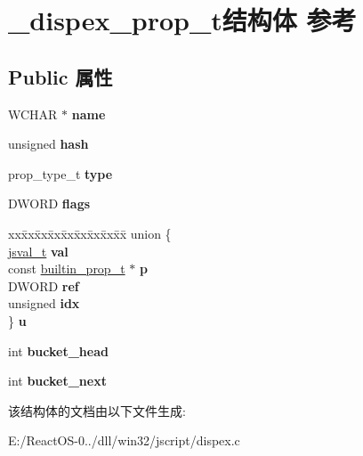 \hypertarget{struct__dispex__prop__t}{}\section{\+\_\+dispex\+\_\+prop\+\_\+t结构体 参考}
\label{struct__dispex__prop__t}
\subsection*{Public 属性}
\begin{DoxyCompactItemize}
\item 
\mbox{\label{struct__dispex__prop__t_a33a0ad0d74b1007f90173ca262cc3cc3}} 
W\+C\+H\+AR $\ast$ {\bfseries name}
\item 
\mbox{\label{struct__dispex__prop__t_a3b27a922c8fab3c080a8ba4c6651bee4}} 
unsigned {\bfseries hash}
\item 
\mbox{\label{struct__dispex__prop__t_a37ef3e687d76046dd4cf5be53839c8d2}} 
prop\+\_\+type\+\_\+t {\bfseries type}
\item 
\mbox{\label{struct__dispex__prop__t_a9407ca5f6f3c60ecca70d27e4b6dcdaf}} 
D\+W\+O\+RD {\bfseries flags}
\item 
\mbox{\label{struct__dispex__prop__t_ad9700abefb9a459d7f251ba5d3f75269}} 
\begin{tabbing}
xx\=xx\=xx\=xx\=xx\=xx\=xx\=xx\=xx\=\kill
union \{\\
\>\hyperlink{struct__jsval__t}{jsval\_t} {\bfseries val}\\
\>const \hyperlink{structbuiltin__prop__t}{builtin\_prop\_t} $\ast$ {\bfseries p}\\
\>DWORD {\bfseries ref}\\
\>unsigned {\bfseries idx}\\
\} {\bfseries u}\\

\end{tabbing}\item 
\mbox{\label{struct__dispex__prop__t_a790a3b004c478de9fd46411470fd3513}} 
int {\bfseries bucket\+\_\+head}
\item 
\mbox{\label{struct__dispex__prop__t_affff5c73edd7b7177877731ec6f28051}} 
int {\bfseries bucket\+\_\+next}
\end{DoxyCompactItemize}


该结构体的文档由以下文件生成\+:\begin{DoxyCompactItemize}
\item 
E\+:/\+React\+O\+S-\/0../dll/win32/jscript/dispex.\+c\end{DoxyCompactItemize}
